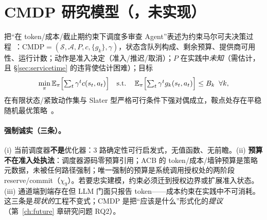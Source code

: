 \section{CMDP 研究模型（\PROPOSED，未实现）}

把“在 token/成本/截止期约束下调度多审查 Agent”表述为约束马尔可夫决策过程~\cite{altman1999}：$\mathrm{CMDP}=(\mathcal{S},\mathcal{A},P,c,\{g_k\},\gamma)$，状态含队列构成、剩余预算、提供商可用性、运行计数；动作是准入决定（准入/推迟/取消）；$P$ 在实践中\emph{未知}（需估计，且 \S\ref{sec:servicetime} 的违背使估计困难）；目标
\begin{equation}
\min_\pi \operatorname{\mathbb{E}}_\pi\Bigl[\textstyle\sum_t\gamma^t c(s_t,a_t)\Bigr]\quad\text{s.t.}\quad \operatorname{\mathbb{E}}_\pi\Bigl[\textstyle\sum_t\gamma^t g_k(s_t,a_t)\Bigr]\le B_k\;\;\forall k,
\end{equation}
在有限状态/紧致动作集与 Slater 型严格可行条件下强对偶成立，鞍点处存在平稳随机最优策略~\cite{altman1999}。

\paragraph{强制诚实（三条）。}
(i) 当前调度器\textbf{不是}优化器：3 路确定性可行启发式，无值函数、无前瞻。(ii) \textbf{预算不在准入处执法}：调度器源码零预算引用；ACB 的 token/成本/墙钟预算是策略元数据，未被任何路径强制；唯一强制的预算是系统调用授权处的两阶段 reserve/commit（$\chi_9$）。若要忠实建模，约束必须迁到授权边界或扩展准入状态。(iii)  通道端到端存在但 LLM 门面只报告 token——成本约束在实践中不可消耗。这三条是\emph{现状的}工程不变式；CMDP 是把“应该是什么”形式化的\emph{提议}（第~\ref{ch:future} 章研究问题 RQ2）。
